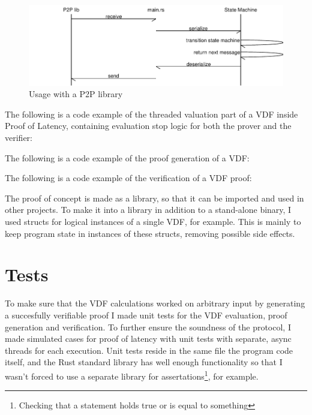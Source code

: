 \begin{figure}
	\includegraphics[width=\textwidth]{pictures/message_flow-eps-converted-to.pdf}
	\caption{Usage with a P2P library}
	\label{message_flow}
\end{figure}

The following is a code example of the threaded valuation part of a VDF inside Proof of Latency, containing evaluation stop logic for both the prover and the verifier:


The following is a code example of the proof generation of a VDF:

The following is a code example of the verification of a VDF proof:

The proof of concept is made as a library, so that it can be imported and used in other projects. To make it into a library in addition to a stand-alone binary, I used structs for logical instances of a single VDF, for example. This is mainly to keep program state in instances of these structs, removing possible side effects.


\section{Tests}
To make sure that the VDF calculations worked on arbitrary input by generating a succesfully verifiable proof I made unit tests for the VDF evaluation, proof generation and verification. To further ensure the soundness of the protocol, I made simulated cases for proof of latency with unit tests with separate, async threads for each execution. Unit tests reside in the same file the program code itself, and the Rust standard library has well enough functionality so that I wasn't forced to use a separate library for assertations\footnote{Checking that a statement holds true or is equal to something}, for example.

